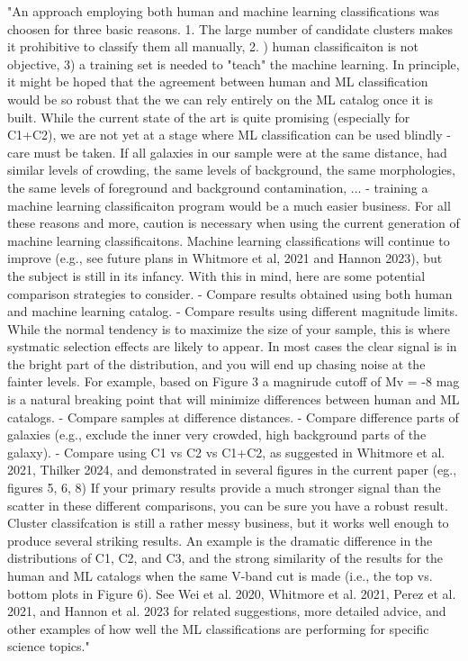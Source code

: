 "An approach employing both human and machine learning classifications was choosen for three basic reasons. 1. The large number of candidate clusters makes it prohibitive to classify them all manually, 2. ) human classificaiton is not objective, 3) a training set is needed to "teach" the machine learning. In principle, it might be hoped that the agreement between human and ML classification would be so robust that the we can rely entirely on the ML catalog once it is built. While the current state of the art is quite promising (especially for C1+C2), we are not yet at a stage where  ML classification can be used blindly - care  must be taken.
If all galaxies in our sample were at the same distance, had similar levels of crowding, the same levels of background, the same morphologies, the same levels of foreground and background contamination, ... -  training a machine learning classificaiton program would be a much easier business. For all these reasons  and more, caution is necessary when using the current generation of machine learning classificaitons. Machine learning classifications will continue to improve (e.g., see future plans in Whitmore et al, 2021 and Hannon 2023), but the subject is still in its infancy.
With this in mind, here are some potential comparison strategies to consider.
- Compare results obtained using both human and machine learning catalog.
- Compare results using different magnitude limits. While the normal tendency is to maximize the size of your sample, this is where systmatic selection effects are likely to appear. In most cases the clear signal is in the bright part of the distribution, and you will end up chasing noise at the fainter levels. For example, based on Figure 3 a magnirude cutoff of Mv = -8 mag is a natural breaking point that will minimize differences between human and ML catalogs.
- Compare samples at difference distances.
- Compare difference parts of galaxies (e.g., exclude the inner very crowded, high background parts of the galaxy).
- Compare using C1 vs C2 vs C1+C2, as suggested in Whitmore et al. 2021, Thilker 2024, and demonstrated in several figures in the current paper (eg., figures 5, 6, 8)
If your primary results provide a much stronger signal than the scatter in these different comparisons, you can be sure you have a robust result.
 Cluster classifcation is still a rather messy business, but it works well enough to produce several striking results. An example is the dramatic difference in the distributions of C1, C2, and C3, and the strong similarity of the results for the human and ML catalogs when the same V-band cut is made (i.e., the top vs.  bottom plots in Figure 6).
See Wei et al. 2020, Whitmore et al. 2021, Perez et al. 2021, and Hannon et al. 2023 for related suggestions, more detailed advice, and other examples of how well the ML classifications are performing for specific science topics."


